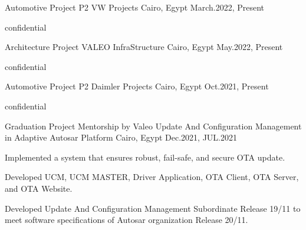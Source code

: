 \begin{cventries}
\cventry
{\normalsize Automotive Project} %
{\Large P2 VW Projects} %
{\normalsize Cairo, Egypt} %
{\normalsize March.2022, Present} %
{
  \begin{cvitems} %
    \item {confidential}
  \end{cvitems}
}
\cventry
{\normalsize Architecture Project} %
{\Large VALEO InfraStructure} %
{\normalsize Cairo, Egypt} %
{\normalsize May.2022, Present} %
{
    \begin{cvitems} %
      \item {confidential}
    \end{cvitems}
}
\cventry
{\normalsize Automotive Project} %
{\Large P2 Daimler Projects} %
{\normalsize Cairo, Egypt} %
{\normalsize Oct.2021, Present} %
{
      \begin{cvitems} %
        \item {confidential}
      \end{cvitems}
}  
\cventry
{\normalsize Graduation Project Mentorship by \color{green}Valeo} %
{\Large Update And Configuration Management in Adaptive Autosar Platform} %
{\normalsize Cairo, Egypt} %
{\normalsize Dec.2021, JUL.2021} %
{
      \begin{cvitems} %
        \item {\normalsize Implemented a system that ensures robust, fail-safe, and secure OTA update.}
        \item {\normalsize Developed UCM, UCM MASTER, Driver Application, OTA Client, OTA Server, and OTA Website.}
        \item {\normalsize Developed Update And Configuration Management Subordinate Release 19/11 to meet software specifications of Autosar organization Release 20/11.}

\end{cvitems}}
\end{cventries}
